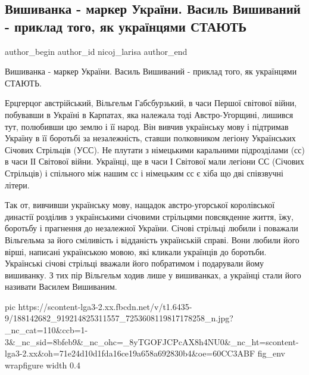  
 
 
 
 
 
\subsection{Вишиванка - маркер України. Василь Вишиваний - приклад того, як українцями СТАЮТЬ}
\label{sec:21_05_2021.fb.nicoj_larisa.1.vyshyvanka_marker_ukrainy}
\ifcmt
 author_begin
   author_id nicoj_larisa
 author_end
\fi

Вишиванка - маркер України. Василь Вишиваний - приклад того, як українцями СТАЮТЬ. 

Ерцгерцог австрійський, Вільгельм Габсбурзький, в часи Першої світової війни,
побувавши в Україні в Карпатах, яка належала тоді Австро-Угорщині, лишився тут,
полюбивши цю землю і її народ. Він вивчив українську мову і підтримав Україну в
її боротьбі за незалежність, ставши полковником легіону Українських Січових
Стрільців (УСС). Не плутати з німецькими каральними підрозділами (сс) в часи ІІ
Світової війни. Українці, ще в часи І Світової мали легіони СС (Січових
Стрільців) і спільного між нашим сс і німецьким сс є хіба що дві співзвучні
літери. 

Так от, вивчивши українську мову, нащадок австро-угорської королівської
династії розділив з українськими січовими стрільцями повсякденне життя, їжу,
боротьбу і прагнення до незалежної України. Січові стрільці любили і поважали
Вільгельма за його сміливість і відданість українській справі. Вони любили його
вірші, написані українською мовою, які кликали українців до боротьби.
Українські січові стрільці вважали його побратимом і подарували йому вишиванку.
З тих пір Вільгельм ходив лише у вишиванках, а українці стали його називати
Василем Вишиваним. 

\ifcmt
  pic https://scontent-lga3-2.xx.fbcdn.net/v/t1.6435-9/188142682_919214825311557_7253608119817178258_n.jpg?_nc_cat=110&ccb=1-3&_nc_sid=8bfeb9&_nc_ohc=_8yTGOFJCPcAX8h4NU0&_nc_ht=scontent-lga3-2.xx&oh=71e24d10d1fda16ce19a658a692830b4&oe=60CC3ABF
	fig_env wrapfigure
	width 0.4
\fi

